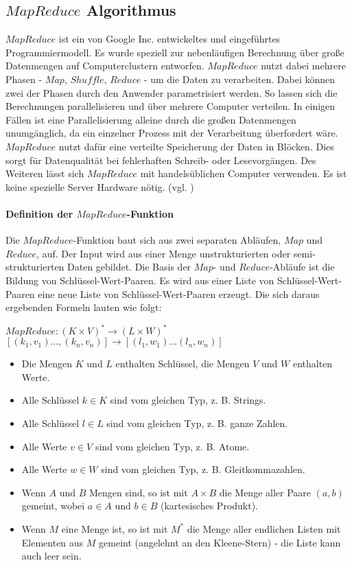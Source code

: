 \subsection{$MapReduce$ Algorithmus}
$MapReduce$ ist ein von Google Inc. entwickeltes und eingeführtes Programmiermodell. Es wurde speziell zur nebenläufigen Berechnung über große Datenmengen auf Computerclustern entworfen. $MapReduce$ nutzt dabei mehrere Phasen - $Map$, $Shuffle$, $Reduce$ - um die Daten zu verarbeiten. Dabei können zwei der Phasen durch den Anwender parametrisiert werden. So lassen sich die Berechnungen parallelisieren und über mehrere Computer verteilen. In einigen Fällen ist eine Parallelisierung alleine durch die großen Datenmengen unumgänglich, da ein einzelner Prozess mit der Verarbeitung überfordert wäre.\\ $MapReduce$ nutzt dafür eine verteilte Speicherung der Daten in Blöcken. Dies sorgt für Datenqualität bei fehlerhaften Schreib- oder Lesevorgängen. Des Weiteren lässt sich $MapReduce$ mit handelsüblichen Computer verwenden. Es ist keine spezielle Server Hardware nötig. (vgl. \cite{wik15})

\paragraph{Definition der $MapReduce$-Funktion}$\;$ \\
Die $MapReduce$-Funktion baut sich aus zwei separaten Abläufen, $Map$ und $Reduce$, auf. Der Input wird aus einer Menge unstrukturierten oder semi-strukturierten Daten gebildet. Die Basis der $Map$- und $Reduce$-Abläufe ist die Bildung von Schlüssel-Wert-Paaren. Es wird aus einer Liste von Schlüssel-Wert-Paaren eine neue Liste von Schlüssel-Wert-Paaren erzeugt. Die sich daraus ergebenden Formeln lauten wie folgt:

\begin{center}
    $MapReduce: (K \times V)^\ast \rightarrow (L \times W)^\ast$\\$[(k_1, v_1) \dots ,(k_n, v_n)] \rightarrow [(l_1, w_1) \dots (l_n, w_n)]$
\end{center}
\begin{itemize}
    \item Die Mengen $K$ und $L$ enthalten Schlüssel, die Mengen $V$ und $W$ enthalten Werte.
    \item Alle Schlüssel $k \in K$ sind vom gleichen Typ, z. B. Strings.
    \item Alle Schlüssel $l \in L$ sind vom gleichen Typ, z. B. ganze Zahlen.
    \item Alle Werte $v \in V$ sind vom gleichen Typ, z. B. Atome.
    \item Alle Werte $w \in W$ sind vom gleichen Typ, z. B. Gleitkommazahlen.
    \item Wenn $A$ und $B$ Mengen sind, so ist mit $A\times B$ die Menge aller Paare $(a, b)$ gemeint, wobei $a \in A$ und $b \in B$ (kartesisches Produkt).
    \item Wenn $M$ eine Menge ist, so ist mit $M^*$ die Menge aller endlichen Listen mit Elementen aus $M$ gemeint (angelehnt an den Kleene-Stern) - die Liste kann auch leer sein.
\end{itemize}

